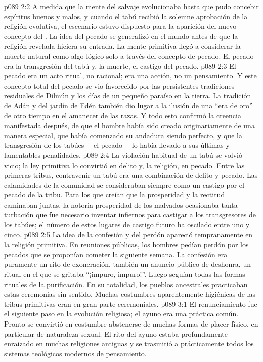 \vs p089 2:2 A medida que la mente del salvaje evolucionaba hasta que pudo concebir espíritus buenos y malos, y cuando el tabú recibió la solemne aprobación de la religión evolutiva, el escenario estuvo dispuesto para la aparición del nuevo concepto del . La idea del pecado se generalizó en el mundo antes de que la religión revelada hiciera su entrada. La mente primitiva llegó a considerar la muerte natural como algo lógico solo a través del concepto de pecado. El pecado era la transgresión del tabú y, la muerte, el castigo del pecado.
\vs p089 2:3 El pecado era un acto ritual, no racional; era una acción, no un pensamiento. Y este concepto total del pecado se vio favorecido por las persistentes tradiciones residuales de Dilmún y los días de un pequeño paraíso en la tierra. La tradición de Adán y del jardín de Edén también dio lugar a la ilusión de una “era de oro” de otro tiempo en el amanecer de las razas. Y todo esto confirmó la creencia manifestada después, de que el hombre había sido creado originariamente de una manera especial, que había comenzado su andadura siendo perfecto, y que la transgresión de los tabúes ---el pecado--- lo había llevado a sus últimas y lamentables penalidades.
\vs p089 2:4 La violación habitual de un tabú se volvió vicio; la ley primitiva lo convirtió en delito y, la religión, en pecado. Entre las primeras tribus, contravenir un tabú era una combinación de delito y pecado. Las calamidades de la comunidad se consideraban siempre como un castigo por el pecado de la tribu. Para los que creían que la prosperidad y la rectitud caminaban juntas, la notoria prosperidad de los malvados ocasionaba tanta turbación que fue necesario inventar infiernos para castigar a los transgresores de los tabúes; el número de estos lugares de castigo futuro ha oscilado entre uno y cinco.
\vs p089 2:5 La idea de la confesión y del perdón apareció tempranamente en la religión primitiva. En reuniones públicas, los hombres pedían perdón por los pecados que se proponían cometer la siguiente semana. La confesión era puramente un rito de exoneración, también un anuncio público de deshonra, un ritual en el que se gritaba “¡impuro, impuro!”. Luego seguían todas las formas rituales de la purificación. En su totalidad, los pueblos ancestrales practicaban estas ceremonias sin sentido. Muchas costumbres aparentemente higiénicas de las tribus primitivas eran en gran parte ceremoniales.
\vs p089 3:1 El renunciamiento fue el siguiente paso en la evolución religiosa; el ayuno era una práctica común. Pronto se convirtió en costumbre abstenerse de muchas formas de placer físico, en particular de naturaleza sexual. El rito del ayuno estaba profundamente enraizado en muchas religiones antiguas y se trasmitió a prácticamente todos los sistemas teológicos modernos de pensamiento.

